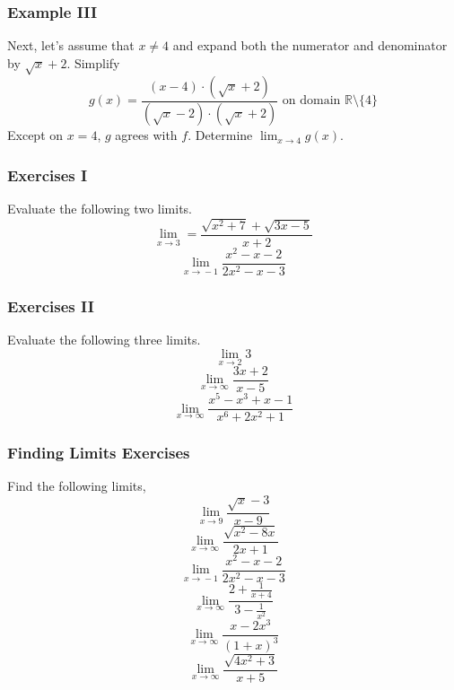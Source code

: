\documentclass[xcolor=dvipsnames]{beamer}
\begin{document}
\begin{frame}
  \frametitle{Example III}
Next, let's assume that $x\neq{}4$ and expand both the numerator
and denominator by $\sqrt{x}+2$. Simplify
\begin{equation}
  \label{eq:oudiolee}
  g(x)=\frac{(x-4)\cdot(\sqrt{x}+2)}{(\sqrt{x}-2)\cdot(\sqrt{x}+2)}\mbox{ on domain }\mathbb{R}\setminus\{4\}
\end{equation}
Except on $x=4$, $g$ agrees with $f$. Determine
$\lim_{x\rightarrow{}4}g(x)$.
\end{frame}

\begin{frame}
  \frametitle{Exercises I}
Evaluate the following two limits.
\begin{equation}
  \label{eq:uheafaix}
  \lim_{x\rightarrow{}3}=\frac{\sqrt{x^{2}+7}+\sqrt{3x-5}}{x+2}
\end{equation}
\begin{equation}
  \label{eq:azeeghee}
  \lim_{x\rightarrow{}-1}\frac{x^{2}-x-2}{2x^{2}-x-3}
\end{equation}
\end{frame}

\begin{frame}
  \frametitle{Exercises II}
Evaluate the following three limits.
\begin{equation}
  \label{eq:haeceema}
  \lim_{x\rightarrow{}2}3
\end{equation}
\begin{equation}
  \label{eq:aogedish}
  \lim_{x\rightarrow\infty}\frac{3x+2}{x-5}
\end{equation}
\begin{equation}
  \label{eq:xaebiaph}
  \lim_{x\rightarrow\infty}\frac{x^{5}-x^{3}+x-1}{x^{6}+2x^{2}+1}
\end{equation}
\end{frame}

\begin{frame}
  \frametitle{Finding Limits Exercises}
Find the following limits,
\begin{equation}
  \label{eq:ixahngoo}
\lim_{x\rightarrow{}9}\frac{\sqrt{x}-3}{x-9}
\end{equation}
\begin{equation}
  \label{eq:etheshoh}
\lim_{x\rightarrow\infty}\frac{\sqrt{x^{2}-8x}}{2x+1}
\end{equation}
\begin{equation}
  \label{eq:chahgaew}
\lim_{x\rightarrow{}-1}\frac{x^{2}-x-2}{2x^{2}-x-3}
\end{equation}
\begin{equation}
  \label{eq:oofeegae}
\lim_{x\rightarrow\infty}\frac{2+\frac{1}{x+4}}{3-\frac{1}{x^{2}}}
\end{equation}
\begin{equation}
  \label{eq:yupeethi}
\lim_{x\rightarrow\infty}\frac{x-2x^{3}}{(1+x)^{3}}
\end{equation}
\begin{equation}
  \label{eq:reibaize}
\lim_{x\rightarrow\infty}\frac{\sqrt{4x^{2}+3}}{x+5}
\end{equation}
\end{frame}
\end{document}
